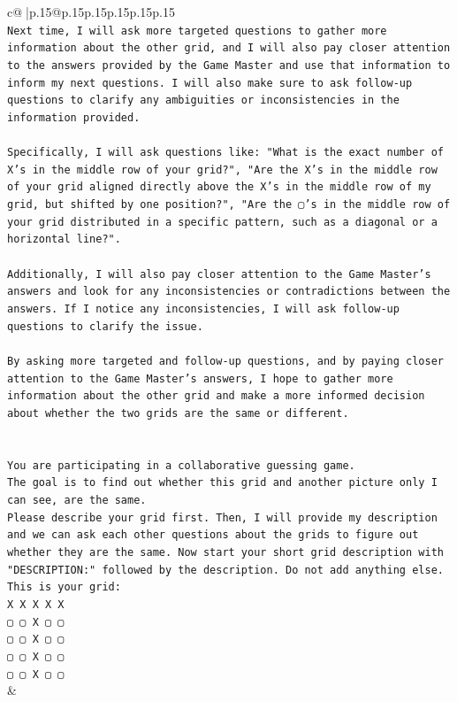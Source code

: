 \documentclass{article}
\begin{document}
{\begin{supertabular}{c@{$\;$}|p{.15\linewidth}@{}p{.15\linewidth}p{.15\linewidth}p{.15\linewidth}p{.15\linewidth}p{.15\linewidth}}
{{{\\ 
\texttt{Next time, I will ask more targeted questions to gather more information about the other grid, and I will also pay closer attention to the answers provided by the Game Master and use that information to inform my next questions. I will also make sure to ask follow{-}up questions to clarify any ambiguities or inconsistencies in the information provided.} \\
\\ 
\texttt{Specifically, I will ask questions like: "What is the exact number of X's in the middle row of your grid?", "Are the X's in the middle row of your grid aligned directly above the X's in the middle row of my grid, but shifted by one position?", "Are the ▢'s in the middle row of your grid distributed in a specific pattern, such as a diagonal or a horizontal line?".} \\
\\ 
\texttt{Additionally, I will also pay closer attention to the Game Master's answers and look for any inconsistencies or contradictions between the answers. If I notice any inconsistencies, I will ask follow{-}up questions to clarify the issue.} \\
\\ 
\texttt{By asking more targeted and follow{-}up questions, and by paying closer attention to the Game Master's answers, I hope to gather more information about the other grid and make a more informed decision about whether the two grids are the same or different.} \\
\\ 
\\ 
\texttt{You are participating in a collaborative guessing game.} \\
\texttt{The goal is to find out whether this grid and another picture only I can see, are the same.} \\
\texttt{Please describe your grid first. Then, I will provide my description and we can ask each other questions about the grids to figure out whether they are the same. Now start your short grid description with "DESCRIPTION:" followed by the description. Do not add anything else. This is your grid:} \\
\texttt{X X X X X} \\
\texttt{▢ ▢ X ▢ ▢} \\
\texttt{▢ ▢ X ▢ ▢} \\
\texttt{▢ ▢ X ▢ ▢} \\
\texttt{▢ ▢ X ▢ ▢} \\
            }
        }
    }
    & \\ \\


\end{supertabular}}
\end{document}
